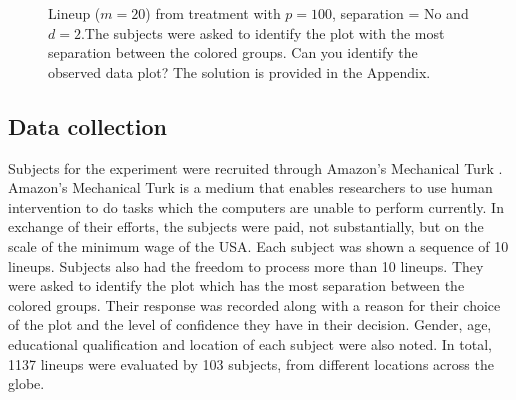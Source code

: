  
\begin{figure}[hbtp]
       \caption{Lineup  ($m=20$) from treatment with $p = 100$, separation = No and $d = 2$.The subjects were asked to identify the plot with the most separation between the colored groups. Can you identify the observed data plot? The solution is provided in the Appendix. }
       \label{fig:test_category}
\end{figure}


\subsection{Data collection}

Subjects  for the experiment were recruited through Amazon's Mechanical Turk  \citep{turk}. Amazon's Mechanical Turk is a medium that enables researchers to use human intervention to do tasks which the computers are unable to perform currently. In exchange of their efforts, the subjects were paid, not substantially, but on the scale of the minimum wage of the USA.  Each subject was shown a sequence of 10 lineups. Subjects also had the freedom to process more than 10 lineups. They were asked to identify the plot which has the most separation between the colored groups. Their response was recorded along with a reason for their choice of the plot and the level of confidence they have in their decision.  Gender, age, educational qualification and location of each subject were also noted. In total, 1137 lineups were evaluated by 103 subjects, from different locations across the globe.



